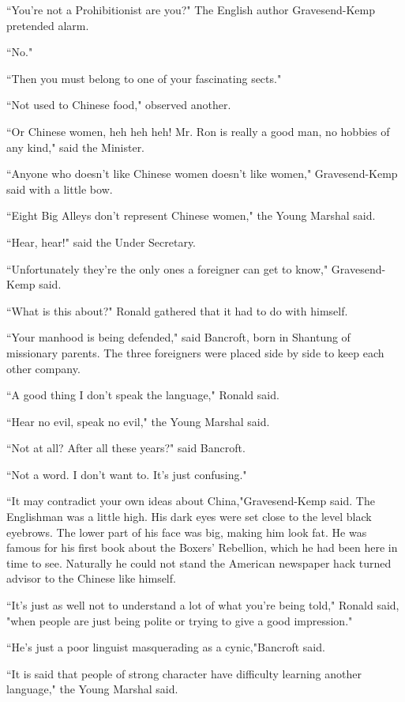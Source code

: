 \par ``You're not a Prohibitionist are you?" The English author Gravesend-Kemp pretended alarm.
\par ``No."
\par ``Then you must belong to one of your fascinating sects."
\par ``Not used to Chinese food," observed another.
\par ``Or Chinese women, heh heh heh! Mr. Ron is really a good man, no hobbies of any kind," said the Minister.
\par ``Anyone who doesn't like Chinese women doesn't like women," Gravesend-Kemp said with a little bow.
\par ``Eight Big Alleys don't represent Chinese women," the Young Marshal said.
\par ``Hear, hear!" said the Under Secretary.
\par ``Unfortunately they're the only ones a foreigner can get to know," Gravesend-Kemp said.
\par ``What is this about?" Ronald gathered that it had to do with himself.
\par ``Your manhood is being defended," said Bancroft, born in Shantung of missionary parents. The three foreigners were placed side by side to keep each other company.
\par ``A good thing I don't speak the language," Ronald said.
\par ``Hear no evil, speak no evil," the Young Marshal said.
\par ``Not at all? After all these years?" said Bancroft.
\par ``Not a word. I don't want to. It's just confusing."
\par ``It may contradict your own ideas about China,"Gravesend-Kemp said. The Englishman was a little high. His dark eyes were set close to the level black eyebrows. The lower part of his face was big, making him look fat. He was famous for his first book about the Boxers' Rebellion, which he had been here in time to see. Naturally he could not stand the American newspaper hack turned advisor to the Chinese like himself.
\par ``It's just as well not to understand a lot of what you're being told," Ronald said, "when people are just being polite or trying to give a good impression."
\par ``He's just a poor linguist masquerading as a cynic,"Bancroft said.
\par ``It is said that people of strong character have difficulty learning another language," the Young Marshal said.

